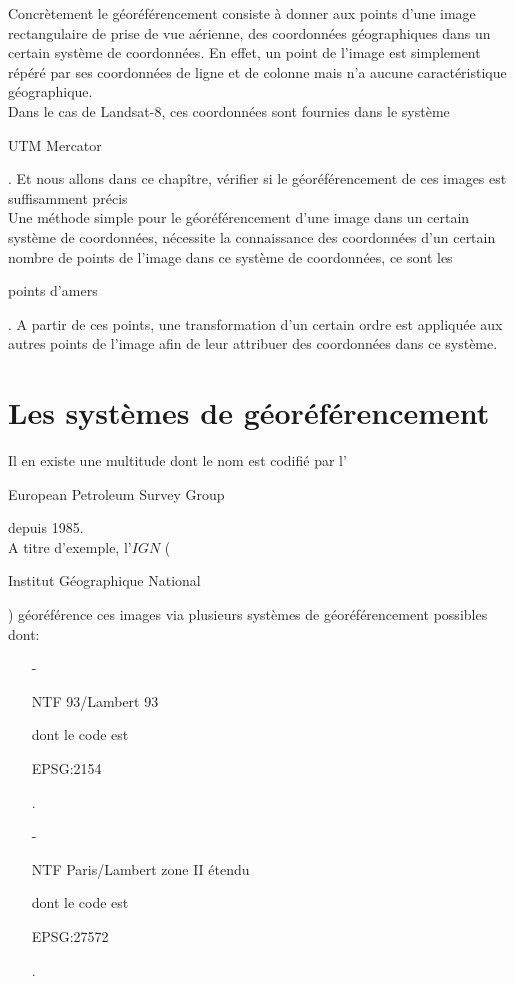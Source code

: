 \documentclass{book}
\begin{document}
Concrètement le géoréférencement consiste à donner aux points 
d'une image rectangulaire de prise de vue aérienne, des coordonnées géographiques dans un certain système de coordonnées. 
En effet, un point de l'image est simplement répéré par ses coordonnées de ligne et de colonne mais n'a aucune caractéristique
géographique.\\
Dans le cas de Landsat-8, ces coordonnées sont fournies dans le système \begin{itshape}UTM Mercator\end{itshape}. Et nous allons dans ce chapître, 
vérifier si le géoréférencement de ces images est suffisamment précis\\

Une méthode simple pour le géoréférencement d'une image dans un certain système de coordonnées, nécessite la connaissance 
des coordonnées d'un 
certain nombre de points de l'image dans ce système de coordonnées, ce sont les \begin{itshape}points d'amers\end{itshape}.
A partir de ces points, une transformation d'un certain ordre est appliquée aux autres points de l'image afin de leur attribuer 
des coordonnées dans ce système.\\

\section{Les systèmes de géoréférencement}

Il en existe une multitude dont le nom est codifié par l'\begin{itshape}European Petroleum Survey Group\end{itshape} depuis 1985.\\
A titre d'exemple, l'$IGN$ (\begin{itshape}Institut Géographique National\end{itshape}) géoréférence ces images via plusieurs
systèmes de géoréférencement possibles dont:\\

\begin{itemize}

\item[-] \begin{itshape}NTF 93/Lambert 93\end{itshape} dont le code est \begin{itshape}EPSG:2154\end{itshape}.\\
\item[-] \begin{itshape}NTF Paris/Lambert zone II étendu\end{itshape} dont le code est \begin{itshape}EPSG:27572\end{itshape}.\\
 
\end{itemize}
\end{document}
